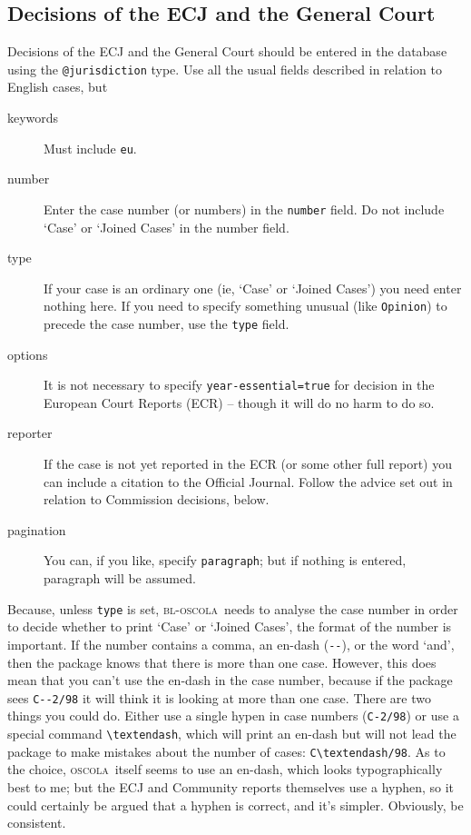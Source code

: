 \documentclass[a5paper,fontsize=9pt,DIV=1]{scrartcl}
\newcommand{\oscola}{\textsc{bl-oscola}}
\newcommand{\oscolashort}{\textsc{oscola}\nocite{oscola}}
\begin{document}
\subsection{Decisions of the ECJ and the General Court}
Decisions of the ECJ and the General Court should be entered in the
database using the \texttt{@jurisdiction} type. Use all the usual
fields described in relation to English cases, but
\begin{description}
\item[keywords] Must include \texttt{eu}.
\item[number]
  Enter the case number (or numbers) in the
  \texttt{number} field. Do not include `Case' or `Joined Cases' in the number field.
\item[type] If your case is an ordinary one (ie, `Case' or `Joined
  Cases') you need enter nothing here. If you need to specify
  something unusual (like \texttt{Opinion}) to precede the case
  number, use the \texttt{type} field.
\item[options] It is not necessary to specify
  \texttt{year-essential=true} for decision in the European Court
  Reports (ECR) -- though it will do no harm to do so.
\item[reporter] If the case is not yet reported in the ECR (or
  some other full report) you can include a citation to the Official
  Journal. Follow the advice set out in relation to Commission
  decisions, below.
\item[pagination] You can, if you like, specify \texttt{paragraph};
  but if nothing is entered, paragraph will be assumed.
\end{description}

Because, unless \texttt{type} is set, \oscola\ needs to analyse the
case number in order to decide whether to print `Case' or `Joined
Cases', the format of the number is important. If the number contains
a comma, an en-dash (\verb|--|), or the word `and', then the package
knows that there is more than one case. However, this does mean that
you can't use the en-dash in the case number, because if the package
sees \verb|C--2/98| it will think it is looking at more than one
case. There are two things you could do. Either use a single hypen in
case numbers (\texttt{C-2/98}) or use a special command
\verb|\textendash|, which will print an en-dash but will not lead
the package to make mistakes about the number of cases:
\verb|C\textendash/98|. As to the choice, \oscolashort\ itself seems to use
an en-dash, which looks typographically best to me; but the ECJ and
Community reports themselves use a hyphen, so it could certainly be
argued that a hyphen is correct, and it's simpler. Obviously, be
consistent.
\end{document}
